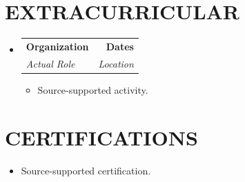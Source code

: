 \documentclass[letterpaper,11pt]{article}
\makeatletter
\newcommand{\resumeItem}[1]{\item\small{#1\vspace{-2pt}}}
\newcommand{\resumeSubheading}[4]{
  \vspace{-2pt}\item
  \begin{tabularx}{\linewidth}[t]{X@{\extracolsep{\fill}}r}
    \textbf{\large #1} & \textbf{\small #2} \\
    \textit{\large #3} & \textit{\small #4} \\
  \end{tabularx}\vspace{-7pt}
}
\newcommand{\resumeSubHeadingListStart}{\begin{itemize}[leftmargin=0.0in,label={}]}
\newcommand{\resumeSubHeadingListEnd}{\end{itemize}}
\newcommand{\resumeItemListStart}{\begin{itemize}}
\newcommand{\resumeItemListEnd}{\end{itemize}\vspace{-5pt}}
\makeatother
\begin{document}
\section{EXTRACURRICULAR}
\resumeSubHeadingListStart
\resumeSubheading{Organization}{Dates}{Actual Role}{Location}
\resumeItemListStart
\resumeItem{Source-supported activity.}
\resumeItemListEnd
\resumeSubHeadingListEnd
\section{CERTIFICATIONS}
\resumeItemListStart
\resumeItem{Source-supported certification.}
\resumeItemListEnd
\end{document}
